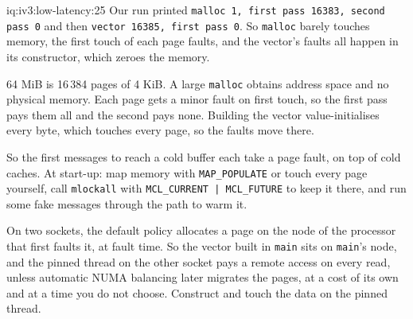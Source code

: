\begin{solution}{iq:iv3:low-latency:25}
Our run printed \texttt{malloc 1, first pass 16383, second pass 0} and then \texttt{vector 16385, first pass 0}. So \texttt{malloc} barely touches memory, the first touch of each page faults, and the vector's faults all happen in its constructor, which zeroes the memory.

64 MiB is 16\,384 pages of 4 KiB. A large \texttt{malloc} obtains address space and no physical memory. Each page gets a minor fault on first touch, so the first pass pays them all and the second pays none. Building the vector value-initialises every byte, which touches every page, so the faults move there.

So the first messages to reach a cold buffer each take a page fault, on top of cold caches. At start-up: map memory with \texttt{MAP\_POPULATE} or touch every page yourself, call \texttt{mlockall} with \texttt{MCL\_CURRENT | MCL\_FUTURE} to keep it there, and run some fake messages through the path to warm it.

On two sockets, the default policy allocates a page on the node of the processor that first faults it, at fault time. So the vector built in \texttt{main} sits on \texttt{main}'s node, and the pinned thread on the other socket pays a remote access on every read, unless automatic NUMA balancing later migrates the pages, at a cost of its own and at a time you do not choose. Construct and touch the data on the pinned thread.

\end{solution}

